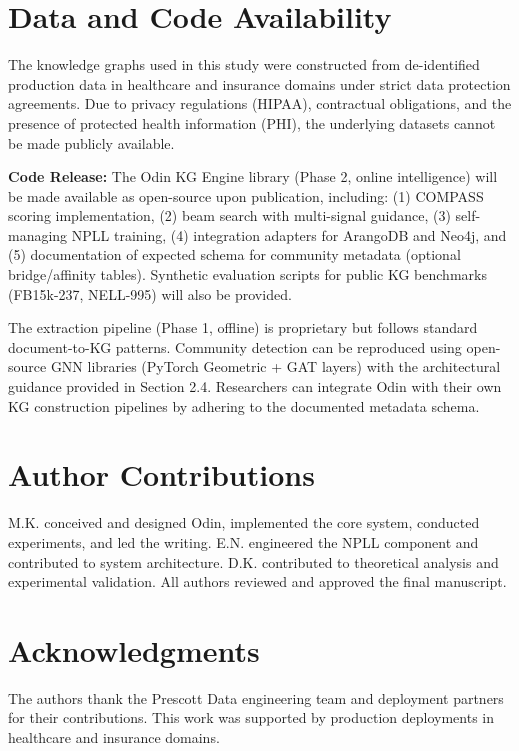 \documentclass[10pt,twocolumn]{article}
\begin{document}
\section*{Data and Code Availability}

The knowledge graphs used in this study were constructed from de-identified production data in healthcare and insurance domains under strict data protection agreements. Due to privacy regulations (HIPAA), contractual obligations, and the presence of protected health information (PHI), the underlying datasets cannot be made publicly available.

\textbf{Code Release:} The Odin KG Engine library (Phase 2, online intelligence) will be made available as open-source upon publication, including: (1) COMPASS scoring implementation, (2) beam search with multi-signal guidance, (3) self-managing NPLL training, (4) integration adapters for ArangoDB and Neo4j, and (5) documentation of expected schema for community metadata (optional bridge/affinity tables). Synthetic evaluation scripts for public KG benchmarks (FB15k-237, NELL-995) will also be provided.

The extraction pipeline (Phase 1, offline) is proprietary but follows standard document-to-KG patterns. Community detection can be reproduced using open-source GNN libraries (PyTorch Geometric + GAT layers) with the architectural guidance provided in Section 2.4. Researchers can integrate Odin with their own KG construction pipelines by adhering to the documented metadata schema.

\section*{Author Contributions}

M.K. conceived and designed Odin, implemented the core system, conducted experiments, and led the writing. E.N. engineered the NPLL component and contributed to system architecture. D.K. contributed to theoretical analysis and experimental validation. All authors reviewed and approved the final manuscript.

\section*{Acknowledgments}

The authors thank the Prescott Data engineering team and deployment partners for their contributions. This work was supported by production deployments in healthcare and insurance domains.
\end{document}
